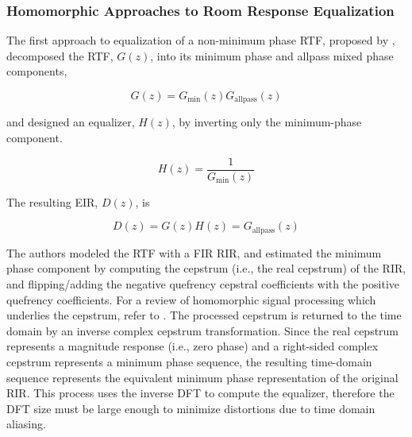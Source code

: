 

\subsubsection{Homomorphic Approaches to Room Response Equalization} \label{homomorphic_eq}

The first approach to equalization of a non-minimum phase RTF, proposed by \cite{neely1979invertibility}, decomposed the RTF, $G(z)$, into its minimum phase and allpass mixed phase components, 

\begin{equation}
	G(z)=G_{\mathrm{min}}(z)G_{\mathrm{allpass}}(z)
\end{equation}

\noindent
and designed an equalizer, $H(z)$, by inverting only the minimum-phase component. 

\begin{equation}
	H(z)=\frac{1}{G_{\mathrm{min}}(z)}
\end{equation}

\noindent
The resulting EIR, $D(z)$, is

\begin{equation}
	D(z)=G(z)H(z)=G_{\mathrm{allpass}}(z)
\end{equation}

The authors modeled the RTF with a FIR RIR, and estimated the minimum phase component by computing the cepstrum (i.e., the real cepstrum) of the RIR, and flipping/adding the negative quefrency cepstral coefficients with the positive quefrency coefficients. For a review of homomorphic signal processing which underlies the cepstrum, refer to \cite{quatieri2002discrete}. The processed cepstrum is returned to the time domain by an inverse complex cepstrum transformation. Since the real cepstrum represents a magnitude response (i.e., zero phase) and a right-sided complex cepstrum represents a minimum phase sequence, the resulting time-domain sequence represents the equivalent minimum phase representation of the original RIR. This process uses the inverse DFT to compute the equalizer, therefore the DFT size must be large enough to minimize distortions due to time domain aliasing. 

